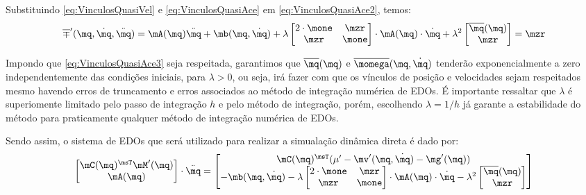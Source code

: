 \documentclass[]{politex}
\begin{document}
Substituindo \eqref{eq:VinculosQuasiVel} e \eqref{eq:VinculosQuasiAce} em \eqref{eq:VinculosQuasiAce2}, temos:
\begin{equation} \label{eq:VinculosQuasiAce3}
\overline{\mp}'(\mq, \dot{\mq}, \ddot{\mq}) =
\mA(\mq) \ddot{\mq} + \mb(\mq, \dot{\mq})
+
\lambda
\begin{bmatrix}
2 \cdot \mone & \mzr \\
\mzr & \mone
\end{bmatrix}
\cdot
\mA(\mq) \cdot \dot{\mq} +
\lambda^2
\begin{bmatrix}
\overline{\mq}(\mq) \\
\mzr
\end{bmatrix}
= \mzr
\end{equation}

Impondo que \eqref{eq:VinculosQuasiAce3} seja respeitada, garantimos que $\overline{\mq}(\mq)$ e $\overline{\momega}(\mq, \dot{\mq})$ tenderão exponencialmente a zero independentemente das condições iniciais, para $\lambda > 0$, ou seja, irá fazer com que os vínculos de posição e velocidades sejam respeitados mesmo havendo erros de truncamento e erros associados ao método de integração numérica de EDOs. É importante ressaltar que $\lambda$ é superiomente limitado pelo passo de integração $h$ e pelo método de integração, porém, escolhendo $\lambda = 1/h$ já garante a estabilidade do método para praticamente qualquer método de integração numérica de EDOs.

Sendo assim, o sistema de EDOs que será utilizado para realizar a simualação dinâmica direta é dado por:
\begin{equation}
\begin{bmatrix}
\mC(\mq)^\msT \mM'(\mq) \\
\mA(\mq)
\end{bmatrix}
\cdot
\ddot{\mq}
=
\begin{bmatrix}
\mC(\mq)^\msT (\mu' - \mv'(\mq,\dot{\mq}) - \mg'(\mq) ) \\
-\mb(\mq,\dot{\mq}) -
\lambda
\begin{bmatrix}
2 \cdot \mone & \mzr \\
\mzr & \mone
\end{bmatrix}
\cdot
\mA(\mq) \cdot \dot{\mq} -
\lambda^2
\begin{bmatrix}
\overline{\mq}(\mq) \\
\mzr
\end{bmatrix} 
\end{bmatrix}
\end{equation}
\end{document}
